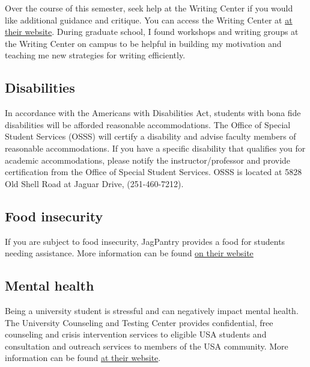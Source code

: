 \documentclass[11pt,]{article}
\begin{document}
Over the course of this semester, seek help at the Writing Center if you
would like additional guidance and critique. You can access the Writing
Center at
\href{https://www.southalabama.edu/departments/academicsuccess/cae/how.it.works.html}{at
their website}. During graduate school, I found workshops and writing
groups at the Writing Center on campus to be helpful in building my
motivation and teaching me new strategies for writing efficiently.

\hypertarget{disabilities}{%
\subsection{Disabilities}\label{disabilities}}

In accordance with the Americans with Disabilities Act, students with
bona fide disabilities will be afforded reasonable accommodations. The
Office of Special Student Services (OSSS) will certify a disability and
advise faculty members of reasonable accommodations. If you have a
specific disability that qualifies you for academic accommodations,
please notify the instructor/professor and provide certification from
the Office of Special Student Services. OSSS is located at 5828 Old
Shell Road at Jaguar Drive, (251-460-7212).

\hypertarget{food-insecurity}{%
\subsection{Food insecurity}\label{food-insecurity}}

If you are subject to food insecurity, JagPantry provides a food for
students needing assistance. More information can be found
\href{https://www.southalabama.edu/departments/sga/foodpantry.html}{on
their website}

\hypertarget{mental-health}{%
\subsection{Mental health}\label{mental-health}}

Being a university student is stressful and can negatively impact mental
health. The University Counseling and Testing Center provides
confidential, free counseling and crisis intervention services to
eligible USA students and consultation and outreach services to members
of the USA community. More information can be found
\href{https://www.southalabama.edu/departments/counseling/}{at their
website}.
\end{document}

